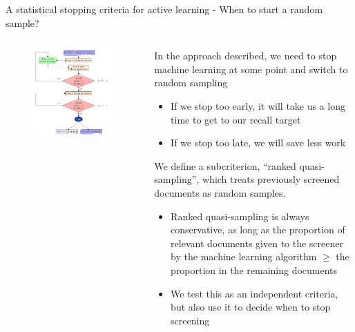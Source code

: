 \documentclass[9pt, aspectratio=169]{beamer}
\begin{document}
\begin{frame}{A statistical stopping criteria for active learning - When to start a random sample?}

\begin{columns}
	\begin{column}{0.382\linewidth}
		\begin{figure}
			\includegraphics[width=\linewidth]{../images/flow.pdf}
		\end{figure}
	\end{column}
	\begin{column}{0.618\linewidth}
		In the approach described, we need to stop machine learning at some point and switch to random sampling
		\begin{itemize}
			\item If we stop too early, it will take us a long time to get to our recall target
			\item If we stop too late, we will save less work
		\end{itemize}
	
		\medskip
	
		We define a subcriterion, ``ranked quasi-sampling'', which treats previously screened documents as random samples.
		
		\begin{itemize}
			\item Ranked quasi-sampling is always conservative, as long as the proportion of relevant documents given to the screener by the machine learning algorithm $\geq$ the proportion in the remaining documents
			\item We test this as an independent criteria, but also use it to decide when to stop screening
		\end{itemize}
	\end{column}
\end{columns}

\end{frame}
\end{document}
